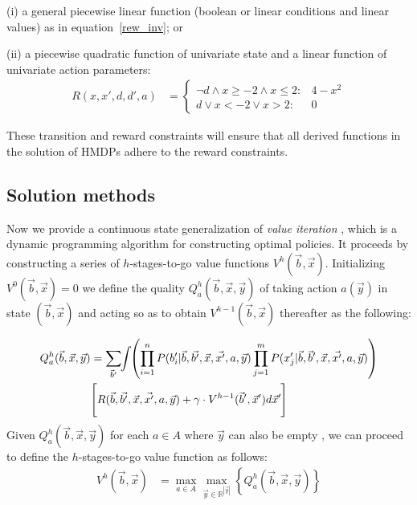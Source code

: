 \documentclass[twoside,11pt]{article}
\begin{document}
(i) a general piecewise linear function (boolean or linear conditions and linear values) as in equation~\eqref{rew_inv}; or

(ii) a piecewise quadratic function of univariate state and a linear function of univariate action parameters:
\begin{align}
R(x,x',d,d', a) & = \begin{cases}
\neg d \land x \geq -2 \land x \leq 2 : & 4 - x^2 \\
d \lor x < -2 \lor x > 2 : & 0
\end{cases} \nonumber 
\end{align}

These transition and reward constraints will ensure that all derived functions in the solution of HMDPs adhere to the reward 
constraints.

\subsection{Solution methods}
\label{sec:soln}
Now we provide a continuous state generalization of {\it value
iteration} \cite{bellman}, which is a dynamic programming algorithm
for constructing optimal policies.  It proceeds by constructing a
series of $h$-stages-to-go value functions $V^h(\vec{b},\vec{x})$.
Initializing $V^0(\vec{b},\vec{x}) = 0$ we define the quality
$Q_a^{h}(\vec{b},\vec{x},\vec{y})$ of taking action $a(\vec{y})$ in state
$(\vec{b},\vec{x})$ and acting so as to obtain
$V^{h-1}(\vec{b},\vec{x})$ thereafter as the following:

\vspace{-4mm}
{%
\begin{align}
Q_a^{h}(\vec{b},\vec{x},\vec{y}) & = 
 \sum_{\vec{b}'} \hspace{-1.0mm} \int \hspace{-1.0mm} \left( \prod_{i=1}^n P(b_i'|\vec{b},\vec{b'},\vec{x},\vec{x'},a,\vec{y}) \prod_{j=1}^m P(x_j'|\vec{b},\vec{b}',\vec{x},\vec{x'},a,\vec{y}) \right) \label{eq:qfun} \\ 
& \Bigg[ R(\vec{b},\vec{b'},\vec{x},\vec{x'}, a,\vec{y}) + \gamma \cdot V^{h-1}(\vec{b}',\vec{x}') d\vec{x}'  \hspace{-0.2mm} \Bigg] \nonumber
\end{align}}
Given $Q_a^h(\vec{b},\vec{x},\vec{y})$ for each $a \in A$ where $\vec{y}$ can also be empty , we can proceed
to define the $h$-stages-to-go value function as follows:
\begin{align}
V^{h}(\vec{b},\vec{x}) & = \max_{a \in A} \max_{\vec{y} \in \mathbb{R}^{|\vec{y}|}} \left\{ Q^{h}_a(\vec{b},\vec{x},\vec{y}) \right\} \label{eq:vfun}
\end{align}
\end{document}
